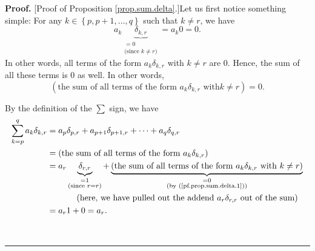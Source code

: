 \documentclass[numbers=enddot,12pt,final,onecolumn,notitlepage]{scrartcl}%
\theoremstyle{definition}
\newenvironment{proof}[1][Proof]{\noindent\textbf{#1.} }{\ \rule{0.5em}{0.5em}}
\let\sumnonlimits\sum
\renewcommand{\sum}{\sumnonlimits\limits}
\begin{document}
\begin{proof}
[Proof of Proposition \ref{prop.sum.delta}.]Let us first notice something
simple: For any $k\in\left\{  p,p+1,\ldots,q\right\}  $ such that $k\neq r$,
we have%
\[
a_{k}\underbrace{\delta_{k,r}}_{\substack{=0\\\text{(since }k\neq r\text{)}%
}}=a_{k}0=0.
\]
In other words, all terms of the form $a_{k}\delta_{k,r}$ with $k\neq r$ are
$0$. Hence, the sum of all these terms is $0$ as well. In other words,%
\begin{equation}
\left(  \text{the sum of all terms of the form }a_{k}\delta_{k,r}\text{ with
}k\neq r\right)  =0. \label{pf.prop.sum.delta.1}%
\end{equation}


By the definition of the $\sum$ sign, we have%
\begin{align*}
\sum_{k=p}^{q}a_{k}\delta_{k,r}  &  =a_{p}\delta_{p,r}+a_{p+1}\delta
_{p+1,r}+\cdots+a_{q}\delta_{q,r}\\
&  =\left(  \text{the sum of all terms of the form }a_{k}\delta_{k,r}\right)
\\
&  =a_{r}\underbrace{\delta_{r,r}}_{\substack{=1\\\text{(since }r=r\text{)}%
}}+\underbrace{\left(  \text{the sum of all terms of the form }a_{k}%
\delta_{k,r}\text{ with }k\neq r\right)  }_{\substack{=0\\\text{(by
(\ref{pf.prop.sum.delta.1}))}}}\\
&  \ \ \ \ \ \ \ \ \ \ \left(  \text{here, we have pulled out the addend
}a_{r}\delta_{r,r}\text{ out of the sum}\right) \\
&  =a_{r}1+0=a_{r}.
\end{align*}

\end{proof}
\end{document}
